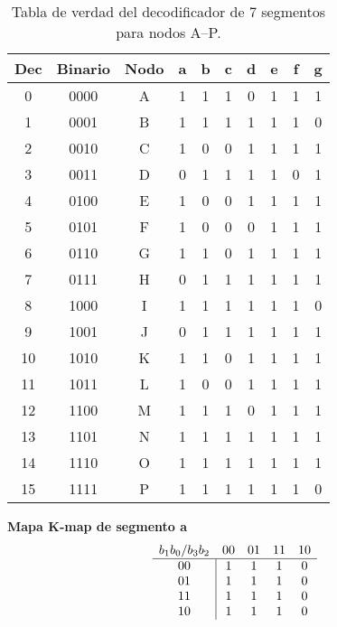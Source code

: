 \documentclass[12pt]{article}
\begin{document}

\begin{table}[h!]
\centering
\begin{tabular}{|c|c|c||c|c|c|c|c|c|c|}
\hline
\textbf{Dec} & \textbf{Binario} & \textbf{Nodo} 
  & \textbf{a} & \textbf{b} & \textbf{c} & \textbf{d} & \textbf{e} & \textbf{f} & \textbf{g} \\
\hline
0  & 0000 & A & 1 & 1 & 1 & 0 & 1 & 1 & 1 \\  
1  & 0001 & B & 1 & 1 & 1 & 1 & 1 & 1 & 0 \\  
2  & 0010 & C & 1 & 0 & 0 & 1 & 1 & 1 & 1 \\  
3  & 0011 & D & 0 & 1 & 1 & 1 & 1 & 0 & 1 \\  
4  & 0100 & E & 1 & 0 & 0 & 1 & 1 & 1 & 1 \\  
5  & 0101 & F & 1 & 0 & 0 & 0 & 1 & 1 & 1 \\  
6  & 0110 & G & 1 & 1 & 0 & 1 & 1 & 1 & 1 \\  
7  & 0111 & H & 0 & 1 & 1 & 1 & 1 & 1 & 1 \\  
8  & 1000 & I & 1 & 1 & 1 & 1 & 1 & 1 & 0 \\  
9  & 1001 & J & 0 & 1 & 1 & 1 & 1 & 1 & 1 \\  
10 & 1010 & K & 1 & 1 & 0 & 1 & 1 & 1 & 1 \\  
11 & 1011 & L & 1 & 0 & 0 & 1 & 1 & 1 & 1 \\  
12 & 1100 & M & 1 & 1 & 1 & 0 & 1 & 1 & 1 \\  
13 & 1101 & N & 1 & 1 & 1 & 1 & 1 & 1 & 1 \\  
14 & 1110 & O & 1 & 1 & 1 & 1 & 1 & 1 & 1 \\  
15 & 1111 & P & 1 & 1 & 1 & 1 & 1 & 1 & 0 \\  
\hline
\end{tabular}
\caption{Tabla de verdad del decodificador de 7 segmentos para nodos A–P.}
\label{tab:7seg_decoder}
\end{table}

\bigskip
\noindent

\medskip
\noindent
\textbf{Mapa K‐map de segmento \textsf{a}}  
\[
\begin{array}{c|cccc}
\multicolumn{1}{c}{b_1b_0/b_3b_2} & \multicolumn{1}{c}{00} & \multicolumn{1}{c}{01} & \multicolumn{1}{c}{11} & \multicolumn{1}{c}{10} \\
\hline
00 & 1 & 1 & 1 & 0 \\
01       & 1 & 1 & 1 & 0 \\
11       & 1 & 1 & 1 & 0 \\
10       & 1 & 1 & 1 & 0 \\
\end{array}
\]
\vspace{1em}
\end{document}
